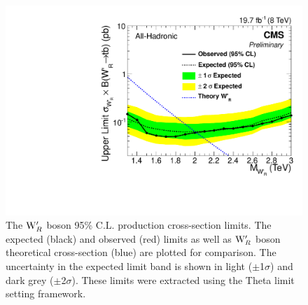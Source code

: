 \begin{figure}[htcb]
\centering
\includegraphics[width=1.0\textwidth]{AN-13-004/figs/limits_theta_Hadroniccomb_log.pdf}
\caption{The $\mathrm{W}^\prime_{R}$ boson 95\% C.L. production cross-section limits.  The expected (black) and observed (red) limits as well as $\mathrm{W}^\prime_{R}$ boson theoretical cross-section (blue) are plotted for comparison.  
The uncertainty in the expected limit band is shown in light ($\pm$1$\sigma$) and dark grey ($\pm$2$\sigma$).
These limits were extracted using the Theta limit setting framework.}
\label{figs:thetalimit}
\end{figure}





